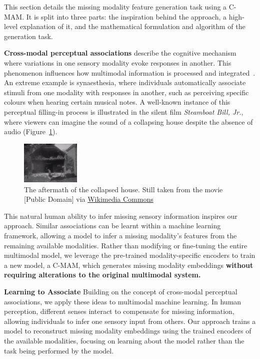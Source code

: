 This section details the missing modality feature generation task using a C-MAM. It is split into three parts: the inspiration behind the approach, a high-level explanation of it, and the mathematical formulation and algorithm of the generation task.

\textbf{Cross-modal perceptual associations} describe the cognitive mechanism where variations in one sensory modality evoke responses in another. This phenomenon influences how multimodal information is processed and integrated~\cite{seeing_what_you_hear,Glicksohn2013,Mondloch2004,Spence2011,HAUW2023167,9018269}. An extreme example is synaesthesia, where individuals automatically associate stimuli from one modality with responses in another, such as perceiving specific colours when hearing certain musical notes. A well-known instance of this perceptual filling-in process is illustrated in the silent film \textit{Steamboat Bill, Jr.}, where viewers can imagine the sound of a collapsing house despite the absence of audio (Figure~\ref{fig:steamboat}).
\begin{figure}[htbp!]
    \centering
    \includegraphics[width=0.25\textwidth]{imgs/steamboat_bill_jr_still.png}
    \caption{The aftermath of the collapsed house. Still taken from the movie [Public Domain] via \href{https://commons.wikimedia.org/wiki/File:GIF_of_Buster_Keaton_in_\%22Steamboat_Bill_Jr\%22_1928.gif}{Wikimedia Commons} }
    \label{fig:steamboat}
\end{figure}

This natural human ability to infer missing sensory information inspires our approach. Similar associations can be learnt within a machine learning framework, allowing a model to infer a missing modality’s features from the remaining available modalities. Rather than modifying or fine-tuning the entire multimodal model, we leverage the pre-trained modality-specific encoders to train a new model, a C-MAM, which generates missing modality embeddings \textbf{without requiring alterations to the original multimodal system.}

\textbf{Learning to Associate} Building on the concept of cross-modal perceptual associations, we apply these ideas to multimodal machine learning. In human perception, different senses interact to compensate for missing information, allowing individuals to infer one sensory input from others. Our approach trains a model to reconstruct missing modality embeddings using the trained encoders of the available modalities, focusing on learning about the model rather than the task being performed by the model.

